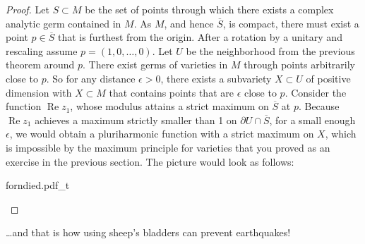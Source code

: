 \documentclass[12pt,openany]{book}
\renewcommand{\Re}{\operatorname{Re}}
\theoremstyle{plain}
\theoremstyle{remark}
\theoremstyle{definition}
\theoremstyle{exercise}
\theoremstyle{example}
\begin{document}
\begin{proof}
Let $S \subset M$ be the set of points through which there exists 
a complex analytic germ contained in $M$.
As $M$, and hence $\overline{S}$, is compact,
there must exist a point $p \in \overline{S}$
that is furthest from
the origin.  After a rotation by a unitary and rescaling assume
$p=(1,0,\ldots,0)$.  Let $U$ be the neighborhood from the previous
theorem around $p$.  There exist germs of varieties in $M$ through points
arbitrarily close to $p$.  So for any distance $\epsilon > 0$,
there exists a subvariety $X \subset U$
of positive dimension with $X \subset M$ that contains points that are
$\epsilon$ close to $p$.  Consider the function $\Re z_1$, whose modulus attains a
strict maximum on $\overline{S}$ at $p$.  Because $\Re z_1$ achieves a maximum
strictly smaller than 1 on $\partial U \cap \overline{S}$, for a small enough $\epsilon$,
we would obtain a pluriharmonic function with a strict
maximum on $X$, which is impossible by the maximum principle for
varieties that you proved as an exercise in the previous section.
The picture would look as follows:
\begin{center}
\medskip
{forndied.pdf_t}
\end{center}
\end{proof}

\vspace*{1in}

\ldots and that is how using sheep's bladders can prevent
earthquakes!



\def\myDOI#1{\href{http://dx.doi.org/#1}{#1}}
\end{document}
